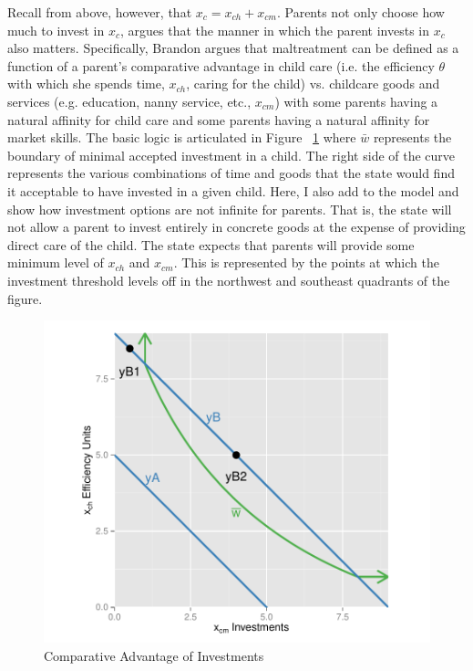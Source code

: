 \documentclass[1p, review]{elsarticle}\usepackage[]{graphicx}\usepackage[]{color}
\makeatletter
\def\maxwidth{ %
  \ifdim\Gin@nat@width>\linewidth
    \linewidth
  \else
    \Gin@nat@width
  \fi
}
\newenvironment{kframe}{%
 \def\at@end@of@kframe{}%
 \ifinner\ifhmode%
  \def\at@end@of@kframe{\end{minipage}}%
  \begin{minipage}{\columnwidth}%
 \fi\fi%
 \def\FrameCommand##1{\hskip\@totalleftmargin \hskip-\fboxsep
 \colorbox{shadecolor}{##1}\hskip-\fboxsep
     \hskip-\linewidth \hskip-\@totalleftmargin \hskip\columnwidth}%
 \MakeFramed {\advance\hsize-\width
   \@totalleftmargin\z@ \linewidth\hsize
   \@setminipage}}%
 {\par\unskip\endMakeFramed%
 \at@end@of@kframe}
\newenvironment{knitrout}{}{} %
\makeatother
\begin{document}
Recall from above, however, that $x_c=x_{ch}+x_{cm}$. Parents not only choose how much to invest in $x_c$, \citet{Brandon2001} argues that the manner in which the parent invests in $x_c$ also matters. Specifically, Brandon argues that maltreatment can be defined as a function of a parent's comparative advantage in child care (i.e. the efficiency $\theta$ with which she spends time, $x_{ch}$, caring for the child) vs. childcare goods and services (e.g. education, nanny service, etc., $x_{cm}$) with some parents having a natural affinity for child care and some parents having a natural affinity for market skills. The basic logic is articulated in Figure ~\ref{fig:plot3} where $\bar{w}$ represents the boundary of minimal accepted investment in a child. The right side of the curve represents the various combinations of time and goods that the state would find it acceptable to have invested in a given child. Here, I also add to the \citet{Brandon2001} model and show how investment options are not infinite for parents. That is, the state will not allow a parent to invest entirely in concrete goods at the expense of providing direct care of the child. The state expects that parents will provide some minimum level of $x_{ch}$ and $x_{cm}$. This is represented by the points at which the investment threshold levels off in the northwest and southeast quadrants of the figure. 

\begin{figure}
\begin{knitrout}\small
{}\color{fgcolor}\begin{kframe}


{\ttfamily\noindent\bfseries\color{errorcolor}{Error: Use 'theme' instead. (Defunct; last used in version 0.9.1)}}\end{kframe}

{\centering \includegraphics[width=\maxwidth]{figure/Figure4-1} 

}



\end{knitrout}
\caption{Comparative Advantage of Investments}\label{fig:plot3}
\end{figure}
\end{document}
